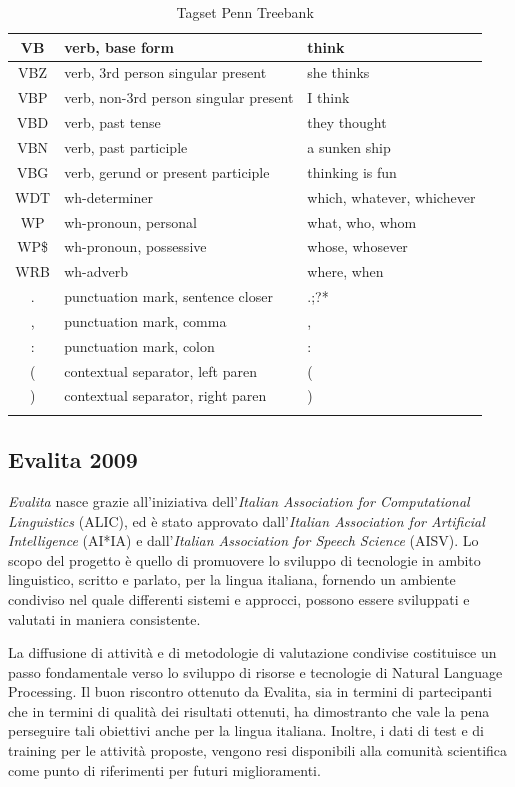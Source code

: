 \begin{longtable}{| c | p{} | p{} |}
  VB & verb, base form & think  \\ \hline
  VBZ & verb, 3rd person singular present & she thinks  \\ \hline
  VBP & verb, non-3rd person singular present & I think  \\ \hline
  VBD & verb, past tense & they thought  \\ \hline
  VBN & verb, past participle & a sunken ship  \\ \hline
  VBG & verb, gerund or present participle & thinking is fun  \\ \hline
  WDT & wh-determiner & which, whatever, whichever  \\ \hline
  WP & wh-pronoun, personal & what, who, whom  \\ \hline
  WP\$ & wh-pronoun, possessive & whose, whosever  \\ \hline
  WRB & wh-adverb & where, when  \\ \hline
  . & punctuation mark, sentence closer & .;?*  \\ \hline
  , & punctuation mark, comma & ,  \\ \hline
  : & punctuation mark, colon & :  \\ \hline
  ( & contextual separator, left paren & (  \\ \hline
  ) & contextual separator, right paren & ) \\ \hline
  \caption{Tagset Penn Treebank} \label{tab:penn-tagset}
\end{longtable}

\subsection{Evalita 2009}
\emph{Evalita} nasce grazie all'iniziativa dell'\emph{Italian Association for Computational Linguistics} (ALIC),
ed \`e stato approvato dall'\emph{Italian Association for Artificial Intelligence} (AI*IA)
e dall'\emph{Italian Association for Speech Science} (AISV).
Lo scopo del progetto \`e quello di promuovere lo sviluppo di tecnologie in ambito linguistico,
scritto e parlato, per la lingua italiana, fornendo un ambiente condiviso nel quale
differenti sistemi e approcci, possono essere sviluppati e valutati in maniera consistente.

La diffusione di attivit\`a e di metodologie di valutazione condivise costituisce un passo fondamentale
verso lo sviluppo di risorse e tecnologie di Natural Language Processing. Il buon riscontro
ottenuto da Evalita, sia in termini di partecipanti che in termini di qualit\`a dei risultati ottenuti,
ha dimostranto che vale la pena perseguire tali obiettivi anche per la lingua italiana.
Inoltre, i dati di test e di training per le attivit\`a proposte, vengono resi disponibili alla
comunit\`a scientifica come punto di riferimenti per futuri miglioramenti.


